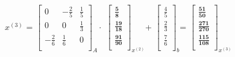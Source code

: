 \documentclass[tikz,12pt,margin=0px]{article}
\newcommand\ddfrac[2]{\frac{\displaystyle #1}{\displaystyle #2}}
\begin{document}
    \begin{center}
        $x^{(3)}$ =
        $\begin{bmatrix}
            0 & -\ddfrac{2}{5} & \ddfrac{1}{5} \\[0.3em]
            0 & 0 & \ddfrac{1}{3} \\[0.3em]
            -\ddfrac{2}{6} & \ddfrac{1}{6} & 0 \\[0.3em]
        \end{bmatrix}_{A} \cdot$
        $\begin{bmatrix}
            \ddfrac{\textbf{5}}{\textbf{8}} \\[0.3em]
            \ddfrac{\textbf{19}}{\textbf{18}} \\[0.3em]
            \ddfrac{\textbf{91}}{\textbf{90}} \\[0.3em]
        \end{bmatrix}_{x^{(2)}}$+
        $\begin{bmatrix}
            \ddfrac{4}{5} \\[0.3em]
            \ddfrac{2}{3} \\[0.3em]
            \ddfrac{7}{6} \\[0.3em]
        \end{bmatrix}_{b}$=
        $\begin{bmatrix}
            \ddfrac{\textbf{51}}{\textbf{50}} \\[0.3em]
            \ddfrac{\textbf{271}}{\textbf{270}} \\[0.3em]
            \ddfrac{\textbf{115}}{\textbf{108}} \\[0.3em]
        \end{bmatrix}_{x^{(3)}}$
    \end{center}
\end{document}

